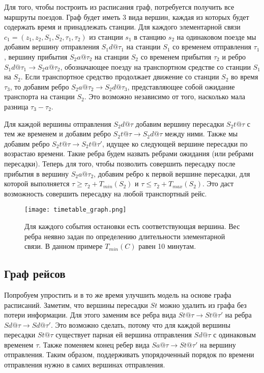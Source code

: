 Для того, чтобы построить из расписания граф, потребуется получить все маршруты поездов. Граф будет иметь 3 вида вершин, каждая из которых будет содержать время и принадлежать станции. Для каждого элементарной связи $c_1=(z_1, z_2, S_1, S_2, \tau_1, \tau_2)$ из станции $s_1$ в станцию $s_2$ на одинаковом поезде мы добавим вершину отправления $S_1d@\tau_1$ на станции $S_1$ со временем отправления $\tau_1$, вершину прибытия $S_2a@\tau_2$ на станции $S_2$ со временем прибытия $\tau_2$ и ребро $S_1d@\tau_1 \rightarrow S_2a@\tau_2$, обозначающее поезду на транспортном средстве со станции $S_1$ на $S_2$. Если транспортное средство продолжает движение со станции $S_2$ во время $\tau_3$, то добавим ребро $S_2a@\tau_2 \rightarrow S_2d@\tau_3$, представляющее собой ожидание транспорта на станции $S_2$. Это возможно независимо от того, насколько мала разница $\tau_3-\tau_2$.

Для каждой вершины отправления $S_2d@\tau$ добавим вершину пересадки $S_2t@\tau$ с тем же временем и добавим ребро $S_2t@\tau \rightarrow S_2d@\tau$ между ними. Также мы добавим ребро $S_2t@\tau \rightarrow S_2t@\tau'$, идущее ко следующей вершине пересадки по возрастаю времени. Такие ребра будем назвать ребрами ожидания (или ребрами пересадки). Теперь для того, чтобы позволить совершить пересадку после прибытия в вершину $S_2a@\tau_2$, добавим ребро к первой вершине пересадки, для которой выполняется $\tau \geqslant \tau_2 + T_{min}(S_2)$ и $\tau \leqslant \tau_2 + T_{max}(S_2)$. Это даст возможность совершить пересадку на любой транспортный рейс.
 
\begin{figure}[!h]
	\centering
	\texttt{[image: timetable\_graph.png]}
	\caption{Для каждого события остановки есть соответствующая вершина. Вес ребра неявно задан по определению длительности элементарной связи. В данном примере $T_{min}(C)$ равен 10 минутам.}\label{fig4}
\end{figure}
\FloatBarrier 
 
\subsection{Граф рейсов}
Попробуем упростить и в то же время улучшить модель на основе графа расписаний. Заметим, что вершины пересадки $St$ можно удалить из графа без потери информации. Для этого заменим все ребра вида $St@\tau \rightarrow St@\tau'$ на ребра $Sd@\tau \rightarrow Sd@\tau'$. Это возможно сделать, потому что для каждой вершины пересадки $St@\tau$ существует парная ей вершина отправления $Sd@\tau$ с одинаковым временем $\tau$. Также поменяем конец ребер вида $Sa@\tau \rightarrow St@\tau'$ на вершину отправления. Таким образом, поддерживать упорядоченный порядок по времени отправления нужно в самих вершинах отправления.

